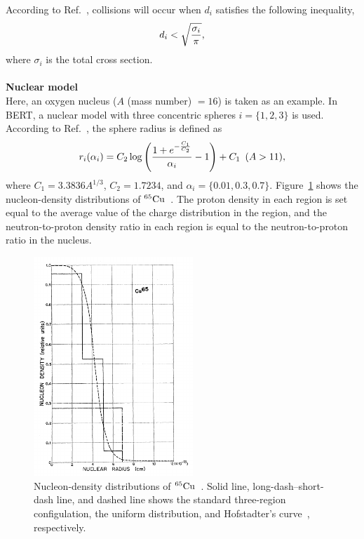 According to Ref.~\cite{Geant4}, collisions will occur when $d_{i}$ satisfies the following inequality,
\begin{eqnarray}
	d_{i} < \sqrt{{\sigma_{i} \over \pi}},
\end{eqnarray}
where $\sigma_{i}$ is the total cross section.\\
\\
\textbf{Nuclear model}\\
\hs
Here, an oxygen nucleus ($A$ (mass number) $= 16$) is taken as an example.
In BERT, a nuclear model with three concentric spheres $i = \{1,2,3\}$ is used.
According to Ref.~\cite{Geant4}, the sphere radius is defined as
\begin{eqnarray}
	r_{i}(\alpha_{i}) = C_{2}\log\Bigg({1 + e^{-{C_{1} \over C_{2}}} \over \alpha_{i}} - 1\Bigg) + C_{1}\,\,\,(A > 11),
\end{eqnarray}
where $C_{1} = 3.3836A^{1/3}$, $C_{2} = 1.7234$, and $\alpha_{i} = \{0.01,0.3,0.7\}$.
Figure~\ref{Bertini_density} shows the nucleon-density distributions of $^{65}{\rm Cu}$~\cite{1963Bertini}.
The proton density in each region is set equal to the average value of the charge distribution in the region, and the neutron-to-proton density ratio in each region is equal to the neutron-to-proton ratio in the nucleus.

\begin{figure}[tbp]
	\centering
	\includegraphics[width=6cm]{Figures/Model/Bertini_density}
	\caption[Nucleon-density distributions of $^{65}{\rm Cu}$]{
	Nucleon-density distributions of $^{65}{\rm Cu}$~\cite{1963Bertini}.
	Solid line, long-dash--short-dash line, and dashed line shows the standard three-region configulation, the uniform distribution, and Hofstadter's curve~\cite{1956Hofstadter}, respectively.
	}\label{Bertini_density}
\end{figure}

